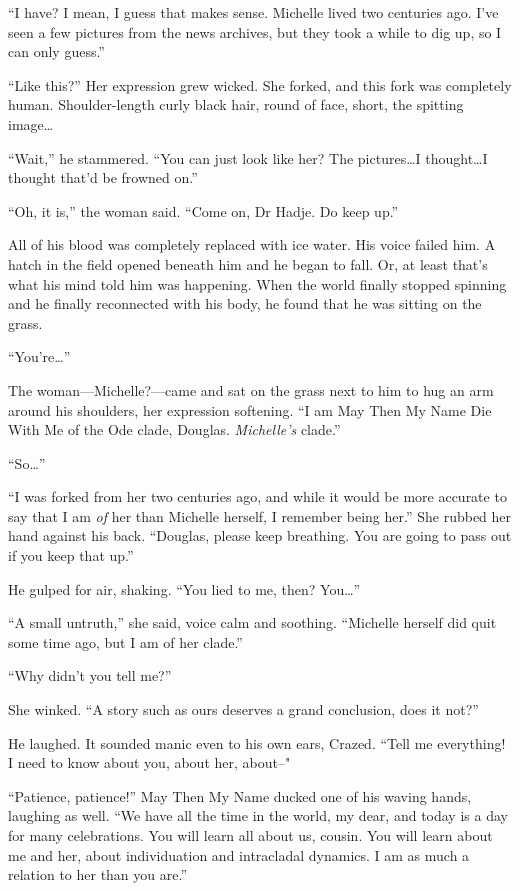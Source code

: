 ``I have? I mean, I guess that makes sense. Michelle lived two centuries ago. I've seen a few pictures from the news archives, but they took a while to dig up, so I can only guess.''

``Like this?'' Her expression grew wicked. She forked, and this fork was completely human. Shoulder-length curly black hair, round of face, short, the spitting image\ldots{}

``Wait,'' he stammered. ``You can just look like her? The pictures\ldots I thought\ldots I thought that'd be frowned on.''

``Oh, it is,'' the woman said. ``Come on, Dr Hadje. Do keep up.''

All of his blood was completely replaced with ice water. His voice failed him. A hatch in the field opened beneath him and he began to fall. Or, at least that's what his mind told him was happening. When the world finally stopped spinning and he finally reconnected with his body, he found that he was sitting on the grass.

``You're\ldots{}''

The woman---Michelle?---came and sat on the grass next to him to hug an arm around his shoulders, her expression softening. ``I am May Then My Name Die With Me of the Ode clade, Douglas. \emph{Michelle's} clade.''

``So\ldots{}''

``I was forked from her two centuries ago, and while it would be more accurate to say that I am \emph{of} her than Michelle herself, I remember being her.'' She rubbed her hand against his back. ``Douglas, please keep breathing. You are going to pass out if you keep that up.''

He gulped for air, shaking. ``You lied to me, then? You\ldots{}''

``A small untruth,'' she said, voice calm and soothing. ``Michelle herself did quit some time ago, but I am of her clade.''

``Why didn't you tell me?''

She winked. ``A story such as ours deserves a grand conclusion, does it not?''

He laughed. It sounded manic even to his own ears, Crazed. ``Tell me everything! I need to know about you, about her, about--"

``Patience, patience!'' May Then My Name ducked one of his waving hands, laughing as well. ``We have all the time in the world, my dear, and today is a day for many celebrations. You will learn all about us, cousin. You will learn about me and her, about individuation and intracladal dynamics. I am as much a relation to her than you are.''


